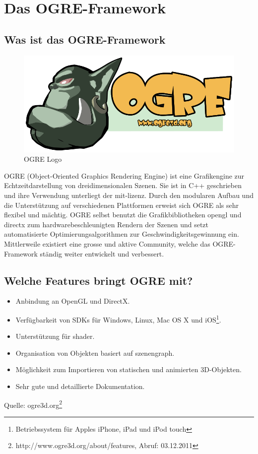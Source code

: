 \section{Das OGRE-Framework}
\label{ogre-framework}

\subsection{Was ist das OGRE-Framework}

\begin{figure}
	\includegraphics[width=1\linewidth]{src/OgreLogo.png}
	\caption{OGRE Logo} %
	\label{OGRE Logo} %
\end{figure}

OGRE (Object-Oriented Graphics Rendering Engine) ist eine Grafikengine zur Echtzeitdarstellung von dreidimensionalen Szenen. Sie ist in C++ geschrieben und ihre Verwendung unterliegt der \gls{mit-lizenz}. Durch den modularen Aufbau und die Unterstützung auf verschiedenen Plattformen erweist sich OGRE als sehr flexibel und mächtig. OGRE selbst benutzt die Grafikbibliotheken \gls{opengl} und \gls{directx} zum hardwarebeschleunigten Rendern der Szenen und setzt automatisierte Optimierungsalgorithmen zur Geschwindigkeitsgewinnung ein. Mittlerweile existiert eine grosse und aktive Community, welche das OGRE-Framework ständig weiter entwickelt und verbessert.

\subsection{Welche Features bringt OGRE mit?}

\begin{itemize}
	\item Anbindung an OpenGL und DirectX.
	\item Verfügbarkeit von SDKs für Windows, Linux, Mac OS X und iOS\footnote{Betriebssystem für Apples iPhone, iPad und iPod touch}.
	\item Unterstützung für \gls{shader}.
	\item Organisation von Objekten basiert auf \gls{szenengraph}.
	\item Möglichkeit zum Importieren von statischen und animierten 3D-Objekten.
	\item Sehr gute und detaillierte Dokumentation.
\end{itemize}
Quelle: ogre3d.org\footnote{http://www.ogre3d.org/about/features, Abruf: 03.12.2011}

